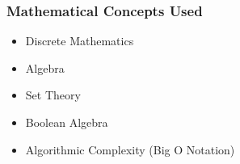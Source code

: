 {\begin{highlight}[\CSPBDataBase]
        \subsubsection*{Mathematical Concepts Used}
        
        \begin{itemize}
            \item Discrete Mathematics
            \item Algebra
            \item Set Theory
            \item Boolean Algebra
            \item Algorithmic Complexity (Big O Notation)
        \end{itemize}
    \end{highlight}
}